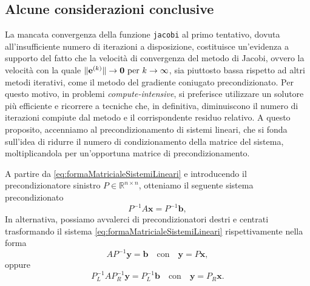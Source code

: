 \subsection{Alcune considerazioni conclusive}
La mancata convergenza della funzione \lstinline{jacobi} al primo tentativo, dovuta all'insufficiente numero di iterazioni a disposizione, costituisce un'evidenza a supporto del fatto che la velocit\`a di convergenza del metodo di Jacobi, ovvero la velocit\`a con la quale $\lVert\mathbf{e}^{(k)}\rVert  \rightarrow \mathbf{0} \text{ per } k\rightarrow{\infty}$, sia piuttosto bassa rispetto ad altri metodi iterativi, come il metodo del gradiente coniugato precondizionato.\newline
Per questo motivo, in problemi \textit{compute-intensive}, si preferisce utilizzare un solutore pi\`u efficiente e ricorrere a tecniche che, in definitiva, diminuiscono il numero di iterazioni compiute dal metodo e il corrispondente residuo relativo. \newline
A questo proposito, accenniamo al precondizionamento di sistemi lineari, che si fonda sull'idea di ridurre il numero di condizionamento della matrice del sistema, moltiplicandola per un'opportuna matrice di precondizionamento.

A partire da \eqref{eq:formaMatricialeSistemiLineari} e introducendo il precondizionatore sinistro $P\in\mathbb{R}^{n\times n}$, otteniamo il seguente sistema precondizionato
\begin{equation}
    P^{-1}A\mathbf{x} = P^{-1}\mathbf{b},
\end{equation}
In alternativa, possiamo avvalerci di precondizionatori destri e centrati trasformando il sistema \eqref{eq:formaMatricialeSistemiLineari} rispettivamente nella forma
\begin{equation*}
    AP^{-1}\mathbf{y} = \mathbf{b} \quad \text{con}\quad \mathbf{y} = P\mathbf{x},
\end{equation*}
oppure
\begin{equation*}
   P_{L}^{-1}AP_{R}^{-1}\mathbf{y}=P_{L}^{-1}\mathbf{b} \quad \text{con} \quad \mathbf{y} = P_{R}\mathbf{x}.
\end{equation*}
